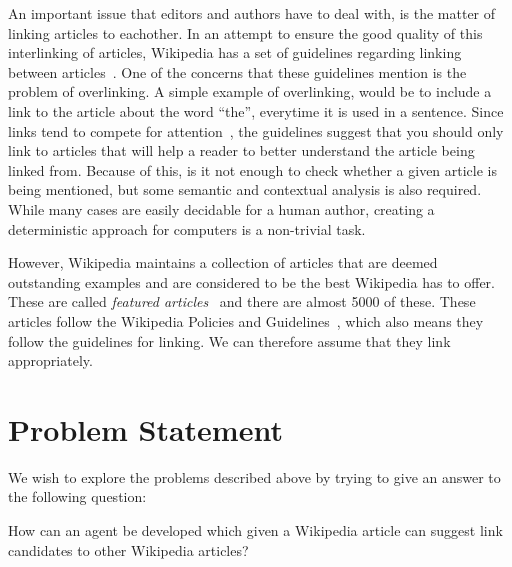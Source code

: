 An important issue that editors and authors have to deal with, is the matter of linking articles to eachother. In an attempt to ensure the good quality of this interlinking of articles, Wikipedia has a set of guidelines regarding linking between articles~\cite{wiki-manual-of-style-overlinking}. 
One of the concerns that these guidelines mention is the problem of overlinking. A simple example of overlinking, would be to include a link to the article about the word \enquote{the}, everytime it is used in a sentence. Since links tend to compete for attention~\cite{hyperlink-structure-using-logs}, the guidelines suggest that you should only link to articles that will help a reader to better understand the article being linked from. Because of this, is it not enough to check whether a given article is being mentioned, but some semantic and contextual analysis is also required. While many cases are easily decidable for a human author, creating a deterministic approach for computers is a non-trivial task.

However, Wikipedia maintains a collection of articles that are deemed outstanding examples and are considered to be the best Wikipedia has to offer. These are called \emph{featured articles}~\cite{wiki-featured-articles} and there are almost 5000 of these. These articles follow the Wikipedia Policies and Guidelines~\cite{wiki-editor-guidelines}, which also means they follow the guidelines for linking. We can therefore assume that they link appropriately.


\section{Problem Statement}
\label{sec:problem_statement}
We wish to explore the problems described above by trying to give an answer to the following question:

\begin{formal}
How can an agent be developed which given a Wikipedia article can suggest link candidates to other Wikipedia articles?
\end{formal}

